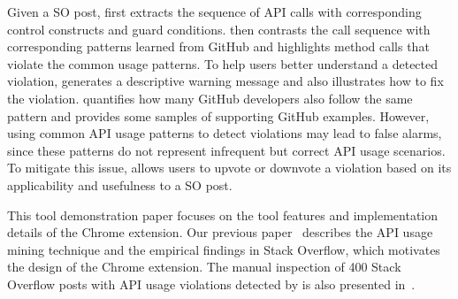 Given a SO post, {\tool} first extracts the sequence of API calls with corresponding control constructs and guard conditions. {\tool} then contrasts the call sequence with corresponding patterns learned from GitHub and highlights method calls that violate the common usage patterns. To help users better understand a detected violation, {\tool} generates a descriptive warning message and also illustrates how to fix the violation. {\tool} quantifies how many GitHub developers also follow the same pattern and provides some samples of supporting GitHub examples. However, using common API usage patterns to detect violations may lead to false alarms, since these patterns do not represent infrequent but correct API usage scenarios. To mitigate this issue, {\tool} allows users to upvote or downvote a violation based on its applicability and usefulness to a SO post. 

This tool demonstration paper focuses on the tool features and implementation details of the Chrome extension. Our previous paper~\cite{zhang2018code} describes the API usage mining technique and the empirical findings in Stack Overflow, which motivates the design of the Chrome extension. The manual inspection of 400 Stack Overflow posts with API usage violations detected by {\tool} is also presented in~\cite{zhang2018code}. 





%
